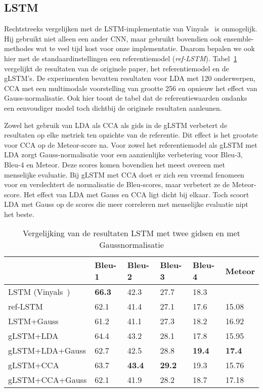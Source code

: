 \subsection{LSTM}
Rechtstreeks vergelijken met de LSTM-implementatie van Vinyals~\cite{Google} is onmogelijk. Hij gebruikt niet alleen een ander CNN, maar gebruikt bovendien ook ensemble-methodes wat te veel tijd kost voor onze implementatie. Daarom bepalen we ook hier met de standaardinstellingen een referentiemodel (\emph{ref-LSTM}). Tabel~\ref{table:lstm_results} vergelijkt de resultaten van de originele paper, het referentiemodel en de gLSTM's. De experimenten bevatten resultaten voor LDA met 120 onderwerpen, CCA met een multimodale voorstelling van grootte 256 en opnieuw het effect van Gauss-normalisatie. Ook hier toont de tabel dat de referentiewaarden ondanks een eenvoudiger model toch dichtbij de originele resultaten aanleunen.

Zowel het gebruik van LDA als CCA als gids in de gLSTM verbetert de resultaten op elke metriek ten opzichte van de referentie. Dit effect is het grootste voor CCA op de Meteor-score na. Voor zowel het referentiemodel als gLSTM met LDA zorgt Gauss-normalisatie voor een aanzienlijke verbetering voor Bleu-3, Bleu-4 en Meteor. Deze scores komen bovendien het meest overeen met menselijke evaluatie. Bij gLSTM met CCA doet er zich een vreemd fenomeen voor en verslechtert de normalisatie de Bleu-scores, maar verbetert ze de Meteor-score. 
Het effect van LDA met Gauss en CCA ligt dicht bij elkaar. Toch scoort LDA met Gauss op de scores die meer correleren met menselijke evaluatie nipt het beste.
    \begin{table}
    	\begin{tabular}{llllll}
    		~                   & Bleu-1 & Bleu-2 & Bleu-3 & Bleu-4 & Meteor \\ \hline
    		LSTM (Vinyals~\cite{Google})      & \textbf{66.3}   & 42.3   & 27.7   & 18.3   & ~     \\ 
    		ref-LSTM         & 62.1   & 41.4   & 27.1   & 17.6   & 15.08  \\
    		LSTM+Gauss        & 61.2   & 41.1   & 27.3   & 18.2   & 16.92  \\
    		gLSTM+LDA         & 64.4   & 43.2   & 28.1   & 17.8   & 15.95  \\
    		gLSTM+LDA+Gauss & 62.7   & 42.5   & 28.8   & \textbf{19.4}   & \textbf{17.4}  \\
	        gLSTM+CCA         & 63.7   & \textbf{43.4}   & \textbf{29.2}   &19.3   & 15.76  \\
	        gLSTM+CCA+Gauss & 62.1   & 41.9   & 28.2   & 18.7   & 17.18  \\
    	\end{tabular}
   	\caption{Vergelijking van de resultaten LSTM met twee gidsen en met Gaussnormalisatie}	
   	\label{table:lstm_results}
    \end{table}

